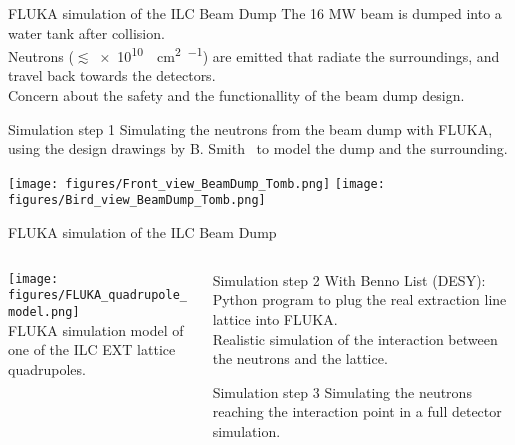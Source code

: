 {
\begin{frame}{FLUKA simulation of the ILC Beam Dump}
\flukalogo
The 16 MW beam is dumped into a water tank after collision.\\Neutrons ($\lesssim$\SI{e10}{\per\square\centi\metre\per\year}) are emitted that radiate the surroundings, and travel back towards the detectors.\\
\vspace*{0.1cm}
Concern about the safety and the functionallity of the beam dump design.
\begin{block}{Simulation step 1}
Simulating the neutrons from the beam dump with FLUKA, using the design drawings by B. Smith~\cite{Smith} to model the dump and the surrounding.
\end{block}

\begin{center}
\texttt{[image: figures/Front\_view\_BeamDump\_Tomb.png]}
\hspace*{0.2cm}
\texttt{[image: figures/Bird\_view\_BeamDump\_Tomb.png]}
\end{center}
\end{frame}

\begin{frame}{FLUKA simulation of the ILC Beam Dump}
\flukalogo
\begin{columns}
\begin{column}[c]{0.4\textwidth}
\texttt{[image: figures/FLUKA\_quadrupole\_model.png]}\\
\small FLUKA simulation model of one of the ILC EXT lattice quadrupoles.
\end{column}
\begin{column}[c]{0.55\textwidth}
\begin{block}{Simulation step 2}
With Benno List (DESY): Python program to plug the real extraction line lattice into FLUKA.\\
Realistic simulation of the interaction between the neutrons and the lattice.
\end{block}
\begin{block}{Simulation step 3}
Simulating the neutrons reaching the interaction point in a full detector simulation.
\end{block}
\end{column}
\end{columns}
\end{frame}

}

